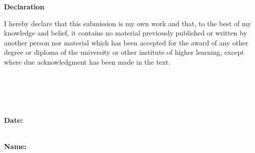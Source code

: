 \begin{center}
{\Large \bf Declaration}
\end{center}
I hereby declare that this submission is my own work and that, to the best of my knowledge and belief, it contains no material previously published or written by another person nor material which has been accepted for the award of any other degree or diploma of the university or other institute of higher learning, except where due acknowledgment has been
made in the text.\\ \\ \\ \\ \\
\\ 
{\bf{Date:}}
\vspace{-1.3cm}

\\
\hspace*{7.8cm} {\bf{Name:}}\\
\\



